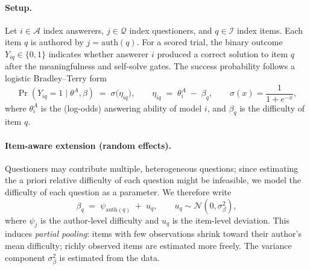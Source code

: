 \documentclass{article} %
\begin{document}
\paragraph{Setup.}
Let $i\in\mathcal A$ index answerers, $j\in\mathcal Q$ index questioners, and $q\in\mathcal I$ index items. Each item $q$ is authored by $j=\mathrm{auth}(q)$. For a scored trial, the binary outcome $Y_{iq}\in\{0,1\}$ indicates whether answerer $i$ produced a correct solution to item $q$ after the meaningfulness and self-solve gates. The success probability follows a logistic Bradley--Terry form
\begin{equation}
\Pr(Y_{iq}=1 \mid \theta^A,\beta) \;=\; \sigma\!\big(\eta_{iq}\big), 
\qquad 
\eta_{iq} \;=\; \theta^A_i \;-\; \beta_q,
\qquad
\sigma(x)=\frac{1}{1+e^{-x}} ,
\end{equation}
where $\theta^A_i$ is the (log-odds) answering ability of model $i$, and $\beta_q$ is the difficulty of item $q$.

\paragraph{Item-aware extension (random effects).}
Questioners may contribute multiple, heterogeneous questions; since estimating the a priori relative difficulty of each question might be infeasible, we model the difficulty of each question as a parameter. We therefore write
\begin{equation}
\beta_q \;=\; \psi_{\mathrm{auth}(q)} \;+\; u_q,
\qquad
u_q \sim \mathcal N(0,\sigma_\beta^2),
\end{equation}
where $\psi_j$ is the author-level difficulty and $u_q$ is the item-level deviation. This induces \emph{partial pooling}: items with few observations shrink toward their author's mean difficulty; richly observed items are estimated more freely. The variance component $\sigma_\beta^2$ is estimated from the data.
\end{document}
